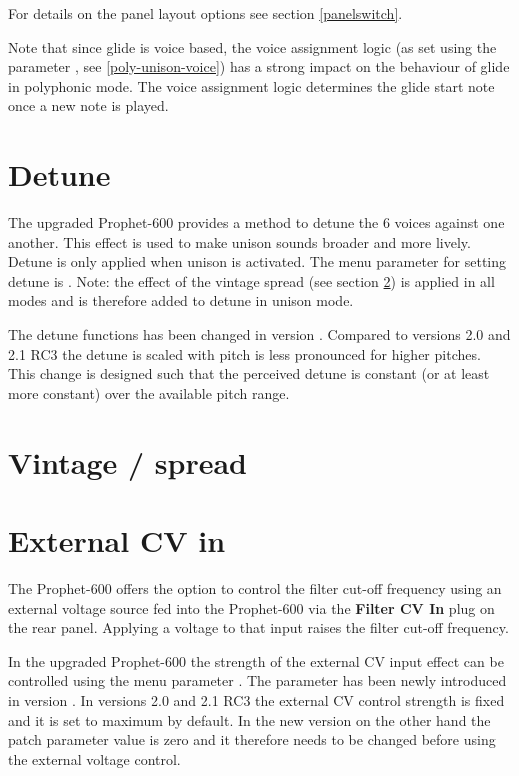 \documentclass[landscape, 11pt, oneside, twoside]{report}
\newenvironment{flowtext}{\addmargin[0cm]{0cm}}{\endaddmargin} %
\begin{document}
\begin{flowtext}
For details on the panel layout options see section \ref{panelswitch}. 

Note that since glide is voice based, the voice assignment logic (as set using the parameter \assign, see \ref{poly-unison-voice}) has a strong impact on the behaviour of glide in polyphonic mode. The voice assignment logic determines the glide start note once a new note is played.

\section{Detune}\label{detune}

The upgraded Prophet-600 provides a method to detune the 6 voices against one another. This effect is used to make unison sounds broader and more lively. Detune is only applied when unison is activated. The menu parameter for setting detune is \detune. Note: the effect of the vintage spread (see section \ref{spreadsett}) is applied in all modes and is therefore added to detune in unison mode. 

The detune functions has been changed in version \version. Compared to versions 2.0 and 2.1 RC3 the detune is scaled with pitch is less pronounced for higher pitches. This change is designed such that the perceived detune is constant (or at least more constant) over the available pitch range. 

\section{Vintage / spread}\label{spreadsett}



\section{External CV in}\label{extcv}

The Prophet-600 offers the option to control the filter cut-off frequency using an external voltage source fed into the Prophet-600 via the \textbf{Filter CV In} plug on the rear panel. Applying a voltage to that input raises the filter cut-off frequency.

In the upgraded Prophet-600 the strength of the external CV input effect can be controlled using the menu parameter \extvolt. The parameter has been newly introduced in version \version. In versions 2.0 and 2.1 RC3 the external CV control strength is fixed and it is set to maximum by default. In the new version on the other hand the patch parameter value is zero and it therefore needs to be changed before using the external voltage control. 


\end{flowtext}
\end{document}
